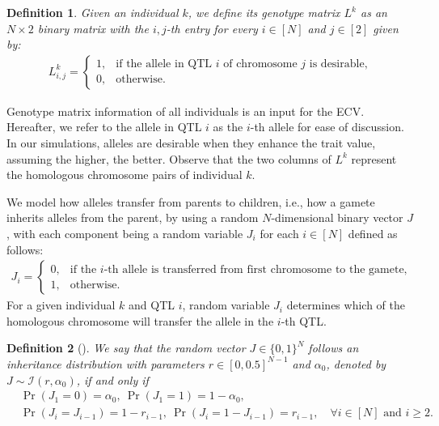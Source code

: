 \documentclass[12pt, a4paper, bibliography=totoc]{scrartcl}
\newtheorem{definition}{Definition}
\newcommand{\Iscr}{\mathcal{I}}
\begin{document}
\begin{definition} \label{defn.genotype_matrix}
Given an individual $k$, we define its genotype matrix $L^{k}$ as an $N\times 2$ binary matrix with the $i,j$-th entry for every $i \in [N]$ and  $j \in [2]$ given by:
		\begin{align} \label{eq:genotype_matrix}
		L^{k}_{i,j}=
		\left\{
		\begin{array}{ll}
		1, & \text{if the allele in QTL $i$ of chromosome $j$ is desirable,}\\
		0, & \text{otherwise.} 
		\end{array}
		\right.
		\end{align}
\end{definition}
Genotype matrix information of all individuals is an input for the ECV.  Hereafter, we refer to the allele in QTL $i$ as the $i$-th allele for ease of discussion. In our simulations, alleles are desirable when they enhance the trait value, assuming the higher, the better. Observe that the two columns of $L^k$ represent the homologous chromosome pairs of individual $k$. 

We model how alleles transfer from parents to children, i.e., how a gamete inherits alleles from the parent, by using a random $N$-dimensional binary vector $J$, with each component being a random variable $J_i$ for each $i \in [N]$ defined as follows: 
\begin{align}\label{eq:inheritance_distribution}
		J_{i}=
		\left\{
		\begin{array}{ll}
		0, & \text{if the $i$-th allele is transferred from first chromosome to the gamete,}\\
		1, & \text{otherwise.} 
		\end{array}
		\right.
		\end{align}
 For a given individual $k$ and QTL $i$, random variable $J_i$ determines which of the homologous chromosome will transfer the allele in the $i$-th QTL.


\begin{definition}[\cite{han2017predicted}] \label{defn.inheritance_distribution}
We say that the random vector $J\in\{0,1\}^N$ follows an inheritance distribution with parameters $r\in[0,0.5]^{N-1}$ and $\alpha_0$, denoted by $J\sim\Iscr(r,\alpha_0)$,  if and only if
\begin{align} \label{eq:inheritance_dist_first_comp}
&\Pr(J_1=0)= \alpha_0,\ \Pr(J_1=1)= 1-\alpha_0,\\
    &\Pr(J_i=J_{i-1}) = 1-r_{i-1},\ \Pr(J_i=1-J_{i-1}) = r_{i-1}, \quad \forall i \in [N] \text{ and } i \ge 2. \label{eq:inheritance_dist_other_copms1}  
\end{align}
\end{definition}
\end{document}
